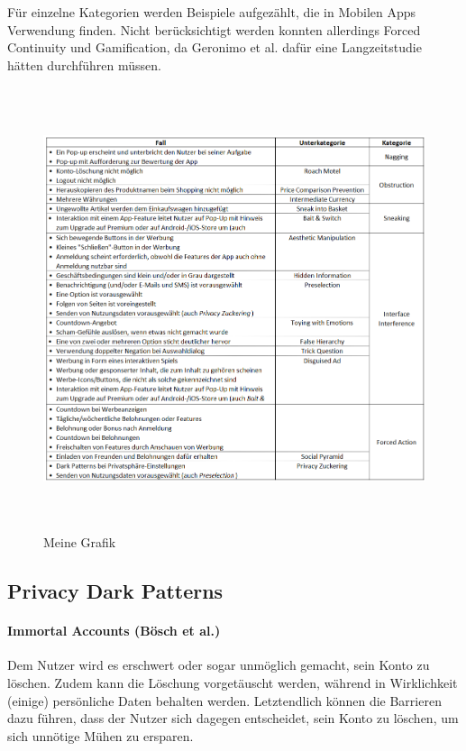 \documentclass[a4paper]{article}
\begin{document}
Für einzelne Kategorien werden Beispiele aufgezählt, die in Mobilen Apps Verwendung finden. Nicht berücksichtigt werden konnten allerdings Forced Continuity und Gamification, da Geronimo et al. dafür eine Langzeitstudie hätten durchführen müssen.\newline
\begin{figure}[h]
 \includegraphics[width=15cm,height=13cm]{"dark_patterns_mobile_ui2"}
 \caption{Meine Grafik}
 \label{fig:meine-grafik}
\end{figure}



\subsection{Privacy Dark Patterns}
\label{sub:privacy_dark_patterns}

\paragraph{Immortal Accounts (Bösch et al.)}
Dem Nutzer wird es erschwert oder sogar unmöglich gemacht, sein Konto zu löschen. Zudem kann die Löschung vorgetäuscht werden, während in Wirklichkeit (einige) persönliche Daten behalten werden. Letztendlich können die Barrieren dazu führen, dass der Nutzer sich dagegen entscheidet, sein Konto zu löschen, um sich unnötige Mühen zu ersparen. 
\end{document}
